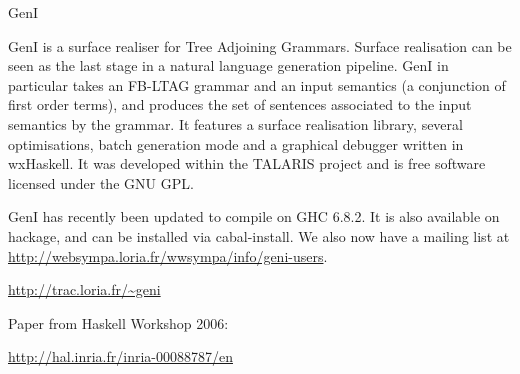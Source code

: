 \begin{hcarentry}[section]{GenI}
\label{geni}
\makeheader

GenI is a surface realiser for Tree Adjoining Grammars. Surface
realisation can be seen as the last stage in a natural language
generation pipeline. GenI in particular takes an FB-LTAG grammar and an
input semantics (a conjunction of first order terms), and produces the
set of sentences associated to the input semantics by the grammar.  It
features a surface realisation library, several optimisations, batch
generation mode and a graphical debugger written in wxHaskell.  It was
developed within the TALARIS project and is free software licensed under
the GNU GPL.

GenI has recently been updated to compile on GHC 6.8.2.  It is also
available on hackage, and can be installed via cabal-install.  We
also now have a mailing list at
\url{http://websympa.loria.fr/wwsympa/info/geni-users}.

\FurtherReading
\begin{compactitem}
\item \url{http://trac.loria.fr/~geni}
\item Paper from Haskell Workshop 2006:

\url{http://hal.inria.fr/inria-00088787/en}
\end{compactitem}
\end{hcarentry}
